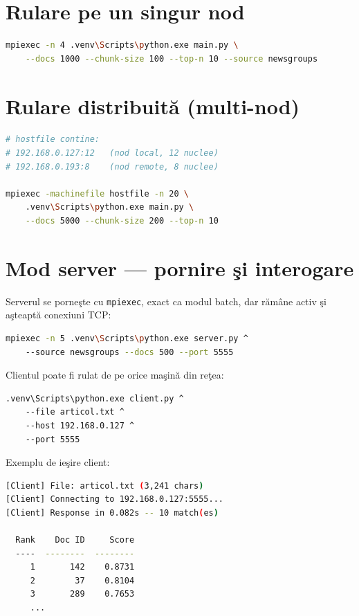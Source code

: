 \documentclass[a4paper,12pt]{report}
\begin{document}
\section*{Rulare pe un singur nod}
\begin{lstlisting}[language=bash, caption={Rulare locala cu 4 procese}]
mpiexec -n 4 .venv\Scripts\python.exe main.py \
    --docs 1000 --chunk-size 100 --top-n 10 --source newsgroups
\end{lstlisting}

\section*{Rulare distribuit\u{a} (multi-nod)}
\begin{lstlisting}[language=bash, caption={Rulare distribuita cu hostfile}]
# hostfile contine:
# 192.168.0.127:12   (nod local, 12 nuclee)
# 192.168.0.193:8    (nod remote, 8 nuclee)

mpiexec -machinefile hostfile -n 20 \
    .venv\Scripts\python.exe main.py \
    --docs 5000 --chunk-size 200 --top-n 10
\end{lstlisting}

\section*{Mod server — pornire \c{s}i interogare}

Serverul se porne\c{s}te cu \texttt{mpiexec}, exact ca modul batch, dar r\u{a}m\^{a}ne activ \c{s}i a\c{s}teapt\u{a} conexiuni TCP:

\begin{lstlisting}[language=bash, caption={Pornire server MPI cu 5 procese}]
mpiexec -n 5 .venv\Scripts\python.exe server.py ^
    --source newsgroups --docs 500 --port 5555
\end{lstlisting}

\noindent Clientul poate fi rulat de pe orice ma\c{s}in\u{a} din re\c{t}ea:

\begin{lstlisting}[language=bash, caption={Interogare server cu un document local}]
.venv\Scripts\python.exe client.py ^
    --file articol.txt ^
    --host 192.168.0.127 ^
    --port 5555
\end{lstlisting}

\noindent Exemplu de ie\c{s}ire client:

\begin{lstlisting}[language=bash, caption={Ie\c{s}ire client — top-10 documente similare}]
[Client] File: articol.txt (3,241 chars)
[Client] Connecting to 192.168.0.127:5555...
[Client] Response in 0.082s -- 10 match(es)

  Rank    Doc ID     Score
  ----  --------  --------
     1       142    0.8731
     2        37    0.8104
     3       289    0.7653
     ...
\end{lstlisting}
\end{document}

